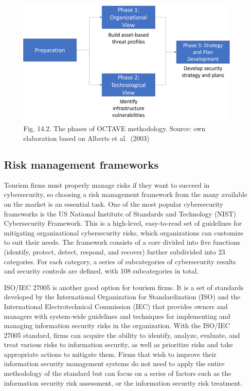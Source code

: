 \documentclass[
  letterpaper,
  DIV=11,
  numbers=noendperiod]{scrreprt}
\begin{document}
\begin{figure}

{\centering \includegraphics[width=6.25in,height=\textheight]{img/fig22.png}

}

\caption{Fig. 14.2. The phases of OCTAVE methodology. Source: own
elaboration based on Alberts et al.~(2003)}

\end{figure}

\hypertarget{risk-management-frameworks}{%
\subsection{Risk management
frameworks}\label{risk-management-frameworks}}

Tourism firms must properly manage risks if they want to succeed in
cybersecurity, so choosing a risk management framework from the many
available on the market is an essential task. One of the most popular
cybersecurity frameworks is the US National Institute of Standards and
Technology (NIST) Cybersecurity Framework. This is a high-level,
easy-to-read set of guidelines for mitigating organizational
cybersecurity risks, which organizations can customize to suit their
needs. The framework consists of a core divided into five functions
(identify, protect, detect, respond, and recover) further subdivided
into 23 categories. For each category, a series of subcategories of
cybersecurity results and security controls are defined, with 108
subcategories in total.

ISO/IEC 27005 is another good option for tourism firms. It is a set of
standards developed by the International Organization for
Standardization (ISO) and the International Electrotechnical Commission
(IEC) that provides owners and managers with system-wide guidelines and
techniques for implementing and managing information security risks in
the organization. With the ISO/IEC 27005 standard, firms can acquire the
ability to identify, analyze, evaluate, and treat various risks to
information security, as well as prioritize risks and take appropriate
actions to mitigate them. Firms that wish to improve their information
security management systems do not need to apply the entire methodology
of the standard but can focus on a series of factors such as the
information security risk assessment, or the information security risk
treatment.
\end{document}

